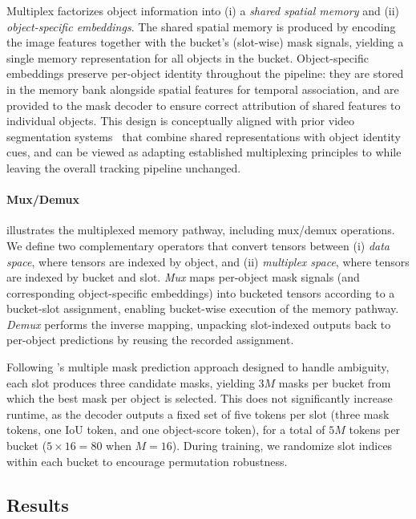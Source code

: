 Multiplex factorizes object information into (i) a \emph{shared spatial memory} and (ii) \emph{object-specific embeddings}. The shared spatial memory is produced by encoding the image features together with the bucket's (slot-wise) mask signals, yielding a single memory representation for all objects in the bucket. Object-specific embeddings preserve per-object identity throughout the pipeline: they are stored in the memory bank alongside spatial features for temporal association, and are provided to the mask decoder to ensure correct attribution of shared features to individual objects.
This design is conceptually aligned with prior video segmentation systems~\citep{AOT, DeAOT, AUSM} that combine shared representations with object identity cues, and can be viewed as adapting established multiplexing principles to \model while leaving the overall tracking pipeline unchanged.

\paragraph{Mux/Demux}
 illustrates the multiplexed memory pathway, including mux/demux operations. We define two complementary operators that convert tensors between (i) \emph{data space}, where tensors are indexed by object, and (ii) \emph{multiplex space}, where tensors are indexed by bucket and slot. \emph{Mux} maps per-object mask signals (and corresponding object-specific embeddings) into bucketed tensors according to a bucket-slot assignment, enabling bucket-wise execution of the memory pathway. \emph{Demux} performs the inverse mapping, unpacking slot-indexed outputs back to per-object predictions by reusing the recorded assignment. 

Following \model's multiple mask prediction approach designed to handle ambiguity, each slot produces three candidate masks, yielding $3M$ masks per bucket from which the best mask per object is selected. This does not significantly increase runtime, as the decoder outputs a fixed set of five tokens per slot (three mask tokens, one IoU token, and one object-score token), for a total of $5M$ tokens per bucket ($5 \times 16 = 80$ when $M{=}16$). During training, we randomize slot indices within each bucket to encourage permutation robustness.

\subsection{Results}
